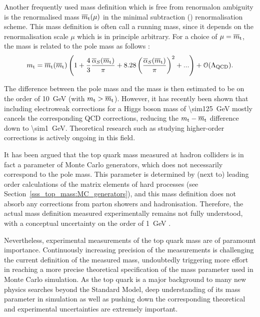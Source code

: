 Another frequently used mass definition which is free from renormalon ambiguity is the renormalised mass $\overline{m}_\mathrm{t}(\mu)$
in the minimal subtraction (\MS) renormalisation scheme. This mass definition is often call a running mass, since it
depends on the renormalisation scale $\mu$ which is in principle arbitrary. For a choice of $\mu=\overline{m}_\mathrm{t}$, the \MS mass
\MSmtop is related to the pole mass \mtop as follows
\autocite{top_pole_mass}:
\begin{equation}
m_\mathrm{t} = \overline{m}_\mathrm{t}(\overline{m}_\mathrm{t}) \left( 1 + \frac{4}{3} \frac{\overline{\alpha}_S(\overline{m}_\mathrm{t})}{\pi} + 8.28
\left(\frac{\overline{\alpha}_S(\overline{m}_\mathrm{t})}{\pi} \right)^2 + ... \right) + \mathcal{O}(\Lambda_\textrm{QCD}).
\end{equation}

The difference between the pole mass and the \MS mass is then estimated to be on the order of \SI{10}{\GeV} (with $m_\mathrm{t}
> \overline{m}_\mathrm{t}$). However, it has recently been shown \autocite{pole_MS_top_difference} that including electroweak
corrections for a Higgs boson mass of \SI{\sim125}{\GeV} mostly cancels the corresponding QCD corrections, reducing the
$m_\mathrm{t}-\overline{m}_\mathrm{t}$ difference down to \SI{\sim1}{\GeV}. Theoretical research such as studying higher-order corrections is
actively ongoing in this field.

It has been argued that the top quark mass measured at hadron colliders is in fact a parameter of Monte Carlo
generators, which does not necessarily correspond to the pole mass. This parameter is determined by (next to) leading
order calculations of the matrix elements of hard processes (see Section~\ref{sss_top_mass:MC_generators}), and this
mass definition does not absorb any corrections from parton showers and hadronisation. Therefore, the actual mass
definition measured experimentally remains not fully understood, with a conceptual uncertainty on the order of
\SI{1}{\GeV} \autocite{measured_top_mass_interpretation}.

Nevertheless, experimental measurements of the top quark mass are of paramount importance. Continuously increasing
precision of the measurements is challenging the current definition of the measured mass, undoubtedly triggering more
effort in reaching a more precise theoretical specification of the mass parameter used in Monte Carlo simulation. As the
top quark is a major background to many new physics searches beyond the Standard Model, deep understanding of its mass
parameter in simulation as well as pushing down the corresponding theoretical and experimental uncertainties are
extremely important.

